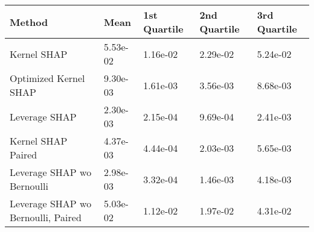 \begin{tabular}{lllll}
  \toprule
  \textbf{Method} & \textbf{Mean} & \textbf{1st Quartile} & \textbf{2nd Quartile} & \textbf{3rd Quartile} \\ \midrule 
Kernel SHAP & 5.53e-02 & 1.16e-02 & 2.29e-02 & 5.24e-02\\
Optimized Kernel SHAP & 9.30e-03 & 1.61e-03 & 3.56e-03 & 8.68e-03\\
Leverage SHAP & \cellcolor{gold!60}2.30e-03 & \cellcolor{gold!60}2.15e-04 & \cellcolor{gold!60}9.69e-04 & \cellcolor{gold!60}2.41e-03\\
Kernel SHAP Paired & \cellcolor{bronze!60}4.37e-03 & \cellcolor{bronze!60}4.44e-04 & \cellcolor{bronze!60}2.03e-03 & \cellcolor{bronze!60}5.65e-03\\
Leverage SHAP wo Bernoulli & \cellcolor{silver!60}2.98e-03 & \cellcolor{silver!60}3.32e-04 & \cellcolor{silver!60}1.46e-03 & \cellcolor{silver!60}4.18e-03\\
Leverage SHAP wo Bernoulli, Paired & 5.03e-02 & 1.12e-02 & 1.97e-02 & 4.31e-02\\
\bottomrule
\end{tabular}
